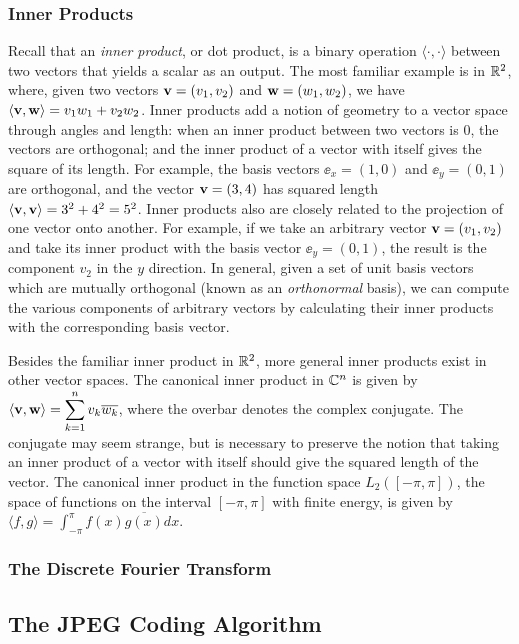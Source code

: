 \subsubsection{Inner Products}
Recall that an {\em inner product}, or dot product, is a binary operation $\langle \cdot, \cdot \rangle$ between two vectors that yields a scalar as an output. The most familiar example is in $\mathbb{R}^2$, where, given two vectors $\mathbf{v} = (v_1, v_2)$ and $\mathbf{w} = (w_1, w_2)$, we have $\langle \mathbf{v}, \mathbf{w} \rangle = v_1w_1 + v_2w_2$. Inner products add a notion of geometry to a vector space through angles and length: when an inner product between two vectors is $0$, the vectors are orthogonal; and the inner product of a vector with itself gives the square of its length. For example, the basis vectors $\ee_x = (1, 0)$ and $\ee_y = (0, 1)$ are orthogonal, and the vector $\mathbf{v} = (3, 4)$ has squared length $\langle \mathbf{v}, \mathbf{v} \rangle = 3^2 + 4^2 = 5^2$. Inner products also are closely related to the projection of one vector onto another. For example, if we take an arbitrary vector $\mathbf{v} = (v_1, v_2)$ and take its inner product with the basis vector $\ee_y = (0, 1)$, the result is the component $v_2$ in the $y$ direction. In general, given a set of unit basis vectors which are mutually orthogonal (known as an {\em orthonormal} basis), we can compute the various components of arbitrary vectors by calculating their inner products with the corresponding basis vector.

Besides the familiar inner product in $\mathbb{R}^2$, more general inner products exist in other vector spaces. The canonical inner product in $\mathbb{C}^n$ is given by $\langle \mathbf{v}, \mathbf{w} \rangle = \displaystyle \sum_{k=1}^{n}v_k\overline{w_k}$, where the overbar denotes the complex conjugate. The conjugate may seem strange, but is necessary to preserve the notion that taking an inner product of a vector with itself should give the squared length of the vector. The canonical inner product in the function space $L_2([-\pi, \pi])$, the space of functions on the interval $[-\pi, \pi]$ with finite energy, is given by $\langle f, g \rangle  = \displaystyle \int_{-\pi}^{\pi}f(x)\overline{g(x)}dx$.

\subsubsection{The Discrete Fourier Transform}


\subsection{The JPEG Coding Algorithm}